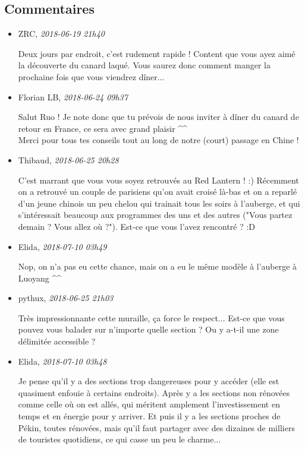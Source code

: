 \documentclass[]{article}
\date{}
\begin{document}
\hypertarget{commentaires}{%
\subsection{Commentaires}\label{commentaires}}

\begin{itemize}
\item
  ZRC, \emph{2018-06-19 21h40}

  Deux jours par endroit, c'est rudement rapide ! Content que vous ayez
  aimé la découverte du canard laqué. Vous saurez donc comment manger la
  prochaine fois que vous viendrez dîner...
\item
  Florian LB, \emph{2018-06-24 09h37}

  Salut Ruo ! Je note donc que tu prévois de nous inviter à dîner du
  canard de retour en France, ce sera avec grand plaisir \^{}\^{}\\
  Merci pour tous tes conseils tout au long de notre (court) passage en
  Chine !
\item
  Thibaud, \emph{2018-06-25 20h28}

  C'est marrant que vous vous soyez retrouvés au Red Lantern ! :)
  Récemment on a retrouvé un couple de parisiens qu'on avait croisé
  là-bas et on a reparlé d'un jeune chinois un peu chelou qui trainait
  tous les soirs à l'auberge, et qui s'intéressait beaucoup aux
  programmes des uns et des autres ("Vous partez demain ? Vous allez où
  ?"). Est-ce que vous l'avez rencontré ? :D
\item
  Elida, \emph{2018-07-10 03h49}

  Nop, on n'a pas eu cette chance, mais on a eu le même modèle à
  l'auberge à Luoyang \^{}\^{}
\item
  pythux, \emph{2018-06-25 21h03}

  Très impressionnante cette muraille, ça force le respect... Est-ce que
  vous pouvez vous balader sur n'importe quelle section ? Ou y a-t-il
  une zone délimitée accessible ?
\item
  Elida, \emph{2018-07-10 03h48}

  Je pense qu'il y a des sections trop dangereuses pour y accéder (elle
  est quasiment enfouie à certains endroits). Après y a les sections non
  rénovées comme celle où on est allés, qui méritent amplement
  l'investissement en temps et en énergie pour y arriver. Et puis il y a
  les sections proches de Pékin, toutes rénovées, mais qu'il faut
  partager avec des dizaines de milliers de touristes quotidiens, ce qui
  casse un peu le charme...
\end{itemize}
\end{document}
